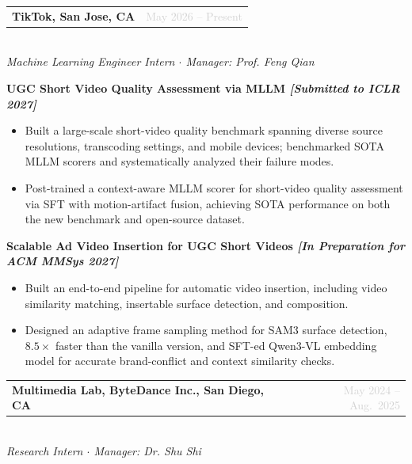 \documentclass[10pt, letterpaper]{article}
\makeatletter
\newcommand{\roleentry}[3]{%
  \vspace{4pt}%
  \noindent
  \begin{tabularx}{\linewidth}{@{}X r@{}}
    \textbf{\color{darkgray}#1} & \textcolor{lightgray}{\small #3}
  \end{tabularx}\\[1pt]
  \noindent\textit{\color{midgray}\small #2}%
  \vspace{2pt}
}
\newcommand{\project}[1]{%
  \vspace{2pt}%
  \noindent\textbf{\color{navy}\small #1}%
  \vspace{1pt}
}
\makeatother
\begin{document}
\vspace{4pt}
\roleentry{TikTok, San Jose, CA}
  {Machine Learning Engineer Intern $\cdot$ Manager: Prof. Feng Qian}
  {May 2026 -- Present }

\project{UGC Short Video Quality Assessment via MLLM\hfill
  \normalfont\textit{[Submitted to ICLR 2027]}}
\begin{itemize}
\item Built a large-scale short-video quality benchmark spanning diverse source resolutions,
      transcoding settings, and mobile devices; benchmarked SOTA MLLM scorers and systematically
      analyzed their failure modes.
\item Post-trained a context-aware MLLM scorer for short-video quality assessment via SFT with motion-artifact fusion, achieving SOTA performance on both the new benchmark and open-source dataset.
\end{itemize}

\project{Scalable Ad Video Insertion for UGC Short Videos\hfill
   \normalfont\textit{[In Preparation for ACM MMSys 2027]}}
\begin{itemize}
  \item Built an end-to-end pipeline for automatic video insertion, including video similarity matching, insertable surface detection, and composition.
\item Designed an adaptive frame sampling method for SAM3 surface detection, $8.5\times$ faster than the vanilla version, and SFT-ed Qwen3-VL embedding model for accurate brand-conflict and context similarity checks.
\end{itemize}

\vspace{4pt}
\roleentry{Multimedia Lab, ByteDance Inc., San Diego, CA}
  {Research Intern $\cdot$ Manager: Dr. Shu Shi}
  {May 2024 -- Aug.\ 2025}
\end{document}
